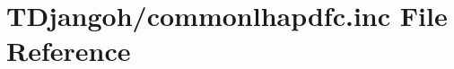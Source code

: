 \hypertarget{commonlhapdfc_8inc}{\section{T\+Djangoh/commonlhapdfc.inc File Reference}
\label{commonlhapdfc_8inc}
}
